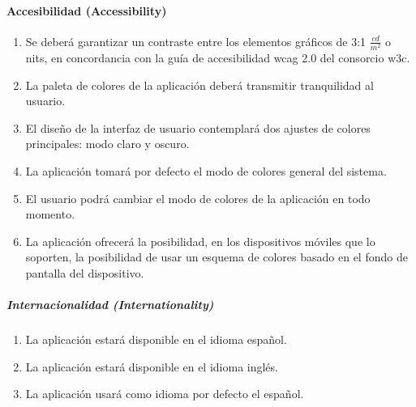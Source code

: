             \paragraph{Accesibilidad (Accessibility)}
                \begin{enumerate}[resume, label=\textbf{\texttt{RNF-\arabic*}}]
                    \item \label{req:no_funcionales:contraste} Se deberá garantizar un contraste entre los elementos gráficos de 3:1 $\frac{cd}{m^{2}}$ o nits, en concordancia con la guía de accesibilidad \gls{wcag} 2.0 del consorcio \gls{w3c}\cite{w3c_web_2008}.
                    \item \label{req:no_funcionales:colores_tranquilidad} La paleta de colores de la aplicación deberá transmitir tranquilidad al usuario.
                    \item \label{req:no_funcionales:modo_claro_oscuro} El diseño de la interfaz de usuario contemplará dos ajustes de colores principales: modo claro y oscuro.
                    \item \label{req:no_funcionales:modo_defecto} La aplicación tomará por defecto el modo de colores general del sistema.
                    \item \label{req:no_funcionales:modo_demanda} El usuario podrá cambiar el modo de colores de la aplicación en todo momento. 
                    \item \label{req:no_funcionales:colores_dinamico} La aplicación ofrecerá la posibilidad, en los dispositivos móviles que lo soporten, la posibilidad de usar un esquema de colores basado en el fondo de pantalla del dispositivo.
                \end{enumerate}
                
                \subparagraph{Internacionalidad (Internationality)}
                    \begin{enumerate}[resume, label=\textbf{\texttt{RNF-\arabic*}}]
                        \item \label{req:no_funcionales:idioma_espanol} La aplicación estará disponible en el idioma español.
                        \item \label{req:no_funcionales:idioma_ingles} La aplicación estará disponible en el idioma inglés.
                        \item \label{req:no_funcionales:idioma_defecto} La aplicación usará como idioma por defecto el español.
                    \end{enumerate}
